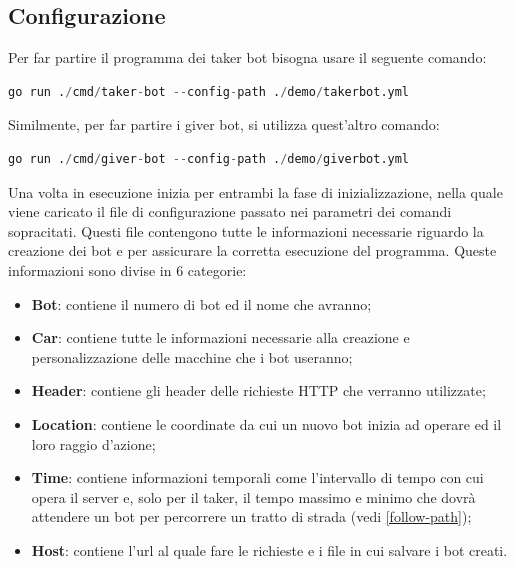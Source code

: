\documentclass[main.tex]{subfiles}
\begin{document}
\subsection{Configurazione}
Per far partire il programma dei taker bot bisogna usare il seguente comando: 
\begin{lstlisting}[language=python]
go run ./cmd/taker-bot --config-path ./demo/takerbot.yml
\end{lstlisting}
Similmente, per far partire i giver bot, si utilizza quest'altro comando:
\begin{lstlisting}[language=python]
go run ./cmd/giver-bot --config-path ./demo/giverbot.yml
\end{lstlisting}
Una volta in esecuzione inizia per entrambi la fase di inizializzazione, nella quale viene caricato il file di configurazione passato nei parametri dei comandi sopracitati. Questi file contengono tutte le informazioni necessarie riguardo la creazione dei bot e per assicurare la corretta esecuzione del programma. Queste informazioni sono divise in 6 categorie:

\begin{itemize}
    \item \textbf{Bot}: contiene il numero di bot ed il nome che avranno;
    \item \textbf{Car}: contiene tutte le informazioni necessarie alla creazione e personalizzazione delle macchine che i bot useranno;
    \item \textbf{Header}: contiene gli header delle richieste HTTP che verranno utilizzate; 
    \item \textbf{Location}: contiene le coordinate da cui un nuovo bot inizia ad operare ed il loro raggio d'azione;
    \item \textbf{Time}: contiene informazioni temporali come l'intervallo di tempo con cui opera il server e, solo per il taker, il tempo massimo e minimo che dovrà attendere un bot per percorrere un tratto di strada (vedi \ref{follow-path});
    \item \textbf{Host}: contiene l'url al quale fare le richieste e i file in cui salvare i bot creati.
\end{itemize}


\end{document}
